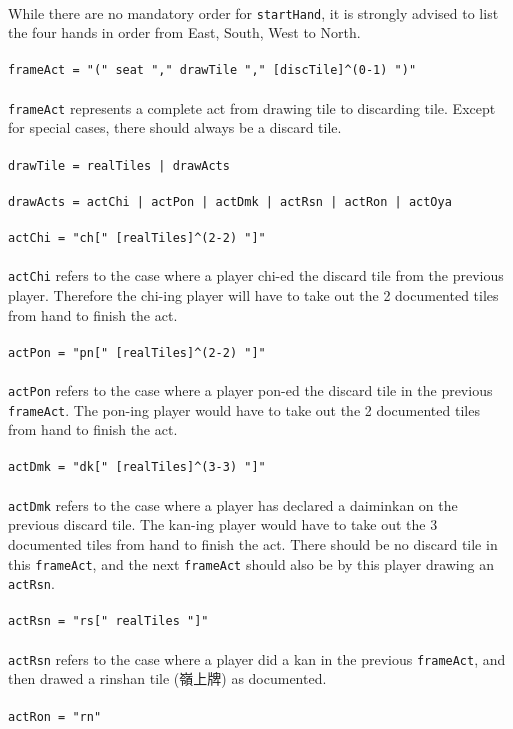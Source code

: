 \documentclass[%
	a4paper%
	,10pt%
	,twoside%
	,notitlepage%
]{article}%
\newcommand*{\ruleSymbol}{\textjapanese{⚠}}%
\newcommand*{\ruleMargin}{\marginpar{\flushright{}\ruleSymbol{}}}%
\newcommand*{\rulePar}{\paragraph*{\ruleMargin{}}}%
\begin{document}
			\paragraph*{}While there are no mandatory order for \lstinline/startHand/, it is strongly advised to list the four hands in order from East, South, West to North. %
			\rulePar{}\lstinline/frameAct = "(" seat "," drawTile "," [discTile]^(0-1) ")"/%
			\paragraph*{}\lstinline/frameAct/ represents a complete act from drawing tile to discarding tile. Except for special cases, there should always be a discard tile. %
			\rulePar{}\lstinline/drawTile = realTiles | drawActs/%
			\rulePar{}\lstinline/drawActs = actChi | actPon | actDmk | actRsn | actRon | actOya /%
			\rulePar{}\lstinline/actChi = "ch[" [realTiles]^(2-2) "]"/%
			\paragraph*{}\lstinline/actChi/ refers to the case where a player chi-ed the discard tile from the previous player. Therefore the chi-ing player will have to take out the 2 documented tiles from hand to finish the act. %
			\rulePar{}\lstinline/actPon = "pn[" [realTiles]^(2-2) "]"/%
			\paragraph*{}\lstinline/actPon/ refers to the case where a player pon-ed the discard tile in the previous \lstinline/frameAct/. The pon-ing player would have to take out the 2 documented tiles from hand to finish the act. %
			\rulePar{}\lstinline/actDmk = "dk[" [realTiles]^(3-3) "]"/%
			\paragraph*{}\lstinline/actDmk/ refers to the case where a player has declared a daiminkan on the previous discard tile. The kan-ing player would have to take out the 3 documented tiles from hand to finish the act. There should be no discard tile in this \lstinline/frameAct/, and the next \lstinline/frameAct/ should also be by this player drawing an \lstinline/actRsn/. %
			\rulePar{}\lstinline/actRsn = "rs[" realTiles "]"/%
			\paragraph*{}\lstinline/actRsn/ refers to the case where a player did a kan in the previous \lstinline/frameAct/, and then drawed a rinshan tile (\textjapanese{嶺上牌}) as documented. %
			\rulePar{}\lstinline/actRon = "rn"/%
\end{document}
